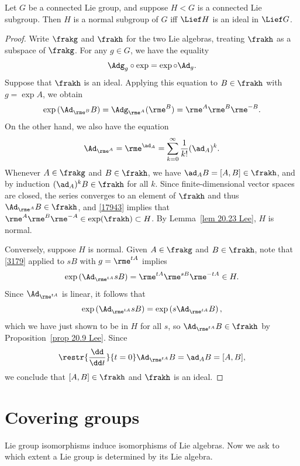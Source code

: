 \begin{thm}\label{thm 20.28 Lee}
    Let $G$ be a connected Lie group, and suppose $H<G$ is a connected Lie subgroup. Then $H$ is a normal subgroup of $G$ iff $\Lief H$ is an ideal in $\Lief G$.
\end{thm}
\begin{proof}
    Write $\frakg$ and $\frakh$ for the two Lie algebras, treating $\frakh$ as a subspace of $\frakg$. For any $g\in G$, we have the equality \[\Adg_g\circ \exp=\exp\circ \Ad_g.\label{3179}\]
    Suppose that $\frakh$ is an ideal. Applying this equation to $B\in\frakh$ with $g=\exp A$, we obtain
    \[\exp\left(\Ad_{\rme^B}B\right)=\Adg_{\rme^A}(\rme^B)=\rme^A \rme^B \rme^{-B}.\label{17943}\]
    On the other hand, we also have the equation
    \[\Ad_{\rme^A}=\rme^{\ad_A}=\sum_{k=0}^\infty \frac{1}{k!}(\ad_A)^k.\]
    Whenever $A\in\frakg$ and $B\in\frakh$, we have $\ad_A B=[A,B]\in\frakh$, and by induction $(\ad_A)^k B\in \frakh$ for all $k$. Since finite-dimensional vector spaces are closed, the series converges to an element of $\frakh$ and thus $\Ad_{\rme^A}B\in\frakh$, and \eqref{17943} implies that $\rme^A \rme^B \rme^{-A}\in \exp (\frakh)\subset H $. By Lemma~\ref{lem 20.23 Lee}, $H$ is normal.

    Conversely, suppose $H$ is normal. Given $A\in\frakg$ and $B\in\frakh$, note that \eqref{3179} applied to $sB$ with $g=\rme^{tA}$ implies
    \[\exp\left(\Ad_{\rme^{tA}} sB\right)=\rme^{tA}\rme^{sB}\rme^{-tA}\in H.\]
    Since $\Ad_{\rme^{tA}}$ is linear, it follows that
    \[\exp\left(\Ad_{\rme^{tA}}sB\right)=\exp\left(s\Ad_{\rme^{tA}}B\right),\]
    which we have just shown to be in $H$ for all $s$, so $\Ad_{\rme^{tA}}B\in\frakh$ by Proposition~\ref{prop 20.9 Lee}. Since
    \[\restr{\frac{\dd}{\dd t}}{t=0}\Ad_{\rme^{tA}}B=\ad_A B=[A,B],\]
    we conclude that $[A,B]\in\frakh$ and $\frakh$ is an ideal.
\end{proof}









\section{Covering groups}


Lie group isomorphisms induce isomorphisms of Lie algebras. Now we ask to which extent a Lie group is determined by its Lie algebra.

